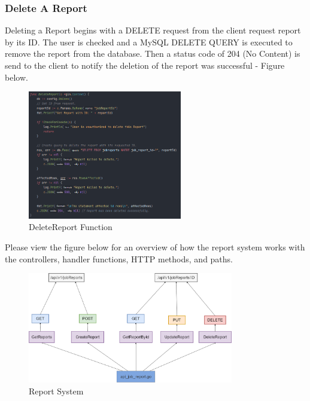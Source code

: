 \subsubsection{Delete A Report}
Deleting a Report begins with a DELETE request from the client request report by its ID. The user is checked and a MySQL DELETE QUERY is executed to remove the report from the database. Then a status code of 204 (No Content) is send to the client to notify the deletion of the report was successful - Figure below. 

\begin{figure}[H]
    \caption{DeleteReport Function}
    \label{image:deleteReport}
    \centering
    \includegraphics[width=0.6\textwidth]{images/horton/report_system/delete_report.png}
\end{figure}

Please view the figure below for an overview of how the report system works with the controllers, handler functions, HTTP methods, and paths.
\begin{figure}[H]
    \caption{Report System}
    \label{image:reportSystem}
    \centering
    \includegraphics[width=0.8\textwidth]{images/horton/report_system/report_system.png}
\end{figure}

